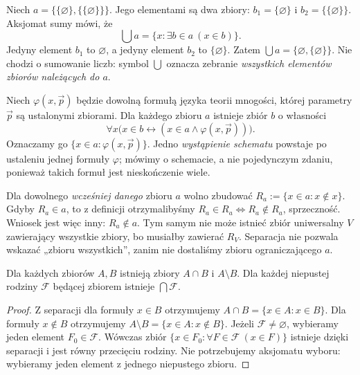 \begin{przyklad}
Niech $a=\{\{\varnothing\},\{\{\varnothing\}\}\}$.
Jego elementami są dwa zbiory:
$b_1=\{\varnothing\}$ i $b_2=\{\{\varnothing\}\}$.
Aksjomat sumy mówi, że
\[
\bigcup a=\{x:\exists b\in a\ (x\in b)\}.
\]
Jedyny element $b_1$ to $\varnothing$, a jedyny
element $b_2$ to $\{\varnothing\}$. Zatem
$\bigcup a=\{\varnothing,\{\varnothing\}\}$.
Nie chodzi o sumowanie liczb: symbol $\bigcup$ oznacza
zebranie \emph{wszystkich elementów zbiorów należących do $a$}.
\end{przyklad}

\begin{definicja}\label{def:zf-separation}
Niech $\varphi(x,\vec p)$ będzie dowolną formułą języka teorii
mnogości, której parametry $\vec p$ są ustalonymi zbiorami.
Dla każdego zbioru $a$ istnieje zbiór $b$ o własności
\[
\forall x\bigl(x\in b\leftrightarrow
(x\in a\land\varphi(x,\vec p))\bigr).
\]
Oznaczamy go $\{x\in a:\varphi(x,\vec p)\}$.
Jedno \emph{wystąpienie schematu} powstaje po ustaleniu jednej
formuły $\varphi$; mówimy o schemacie, a nie pojedynczym
zdaniu, ponieważ takich formuł jest nieskończenie wiele.
\end{definicja}

\begin{przyklad}
Dla dowolnego \emph{wcześniej danego} zbioru $a$ wolno zbudować
$R_a:=\{x\in a:x\notin x\}$. Gdyby $R_a\in a$,
to z definicji otrzymalibyśmy
$R_a\in R_a\iff R_a\notin R_a$, sprzeczność.
Wniosek jest więc inny: $R_a\notin a$. Tym samym
nie może istnieć zbiór uniwersalny $V$ zawierający wszystkie
zbiory, bo musiałby zawierać $R_V$. Separacja nie pozwala
wskazać „zbioru wszystkich”, zanim nie dostaliśmy zbioru
ograniczającego $a$.
\end{przyklad}

\begin{twierdzenie}\label{thm:zf-intersections}
Dla każdych zbiorów $A,B$ istnieją zbiory $A\cap B$ i
$A\setminus B$. Dla każdej niepustej rodziny $\mathcal F$
będącej zbiorem istnieje $\bigcap\mathcal F$.
\end{twierdzenie}
\begin{proof}
Z separacji dla formuły $x\in B$ otrzymujemy
$A\cap B=\{x\in A:x\in B\}$. Dla formuły $x\notin B$
otrzymujemy $A\setminus B=\{x\in A:x\notin B\}$.
Jeżeli $\mathcal F\ne\varnothing$, wybieramy jeden element
$F_0\in\mathcal F$. Wówczas zbiór
$\{x\in F_0:\forall F\in\mathcal F\ (x\in F)\}$
istnieje dzięki separacji i jest równy przecięciu rodziny.
Nie potrzebujemy aksjomatu wyboru: wybieramy jeden element
z jednego niepustego zbioru.
\end{proof}

